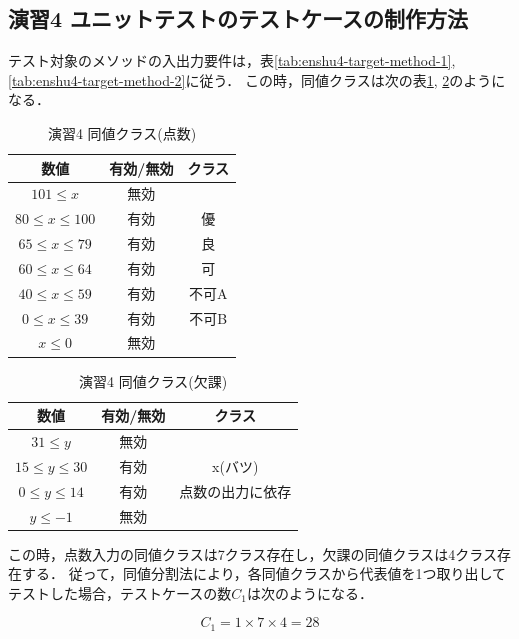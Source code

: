 \documentclass[platex,dvipdfmx,12pt]{jsarticle}
\begin{document}
\subsection{演習4 ユニットテストのテストケースの制作方法}
テスト対象のメソッドの入出力要件は，表\ref{tab:enshu4-target-method-1}, \ref{tab:enshu4-target-method-2}に従う．
この時，同値クラスは次の表\ref{tab:enshu4-class-1}, \ref{tab:enshu4-class-2}のようになる．

\begin{table}[H]
  \centering
  \caption{演習4 同値クラス(点数)}
  \label{tab:enshu4-class-1}
  \begin{tabular}{ccc}
    数値 & 有効/無効 & クラス \\
    \hline
    $101 \leq x $ & 無効 & \\
    $80 \leq x \leq 100$ & 有効 & 優 \\
    $65 \leq x \leq 79$ & 有効 & 良 \\
    $60 \leq x \leq 64$ & 有効 & 可 \\
    $40 \leq x \leq 59$ & 有効 & 不可A \\
    $0 \leq x \leq 39$ & 有効 & 不可B \\
    $x \leq 0$ & 無効 & \\
  \end{tabular}
\end{table}

\begin{table}[H]
  \centering
  \caption{演習4 同値クラス(欠課)}
  \label{tab:enshu4-class-2}
  \begin{tabular}{ccc}
    数値 & 有効/無効 & クラス \\
    \hline
    $31 \leq y $ & 無効 & \\
    $15 \leq y \leq 30$ & 有効 & x(バツ) \\
    $0 \leq y \leq 14$ & 有効 & 点数の出力に依存 \\
    $y \leq -1$ & 無効 &  \\
  \end{tabular}
\end{table}

この時，点数入力の同値クラスは7クラス存在し，欠課の同値クラスは4クラス存在する．
従って，同値分割法により，各同値クラスから代表値を1つ取り出してテストした場合，テストケースの数$C_1$は次のようになる．

\begin{equation}
  C_1 = 1 \times 7 \times 4 = 28
\end{equation}
\end{document}

